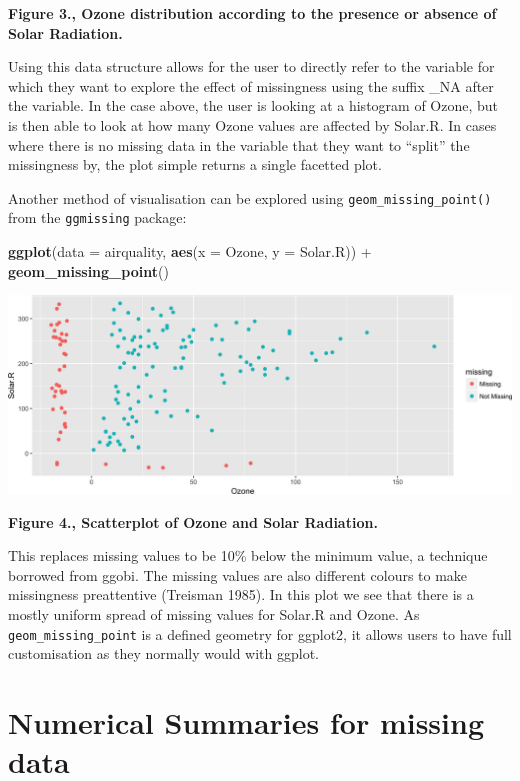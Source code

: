 \documentclass[]{article}
\newenvironment{Shaded}{\begin{snugshade}}{\end{snugshade}}
\newcommand{\KeywordTok}[1]{\textcolor[rgb]{0.13,0.29,0.53}{\textbf{{#1}}}}
\newcommand{\DataTypeTok}[1]{\textcolor[rgb]{0.13,0.29,0.53}{{#1}}}
\newcommand{\StringTok}[1]{\textcolor[rgb]{0.31,0.60,0.02}{{#1}}}
\newcommand{\NormalTok}[1]{{#1}}
\begin{document}
\textbf{Figure 3., Ozone distribution according to the presence or
absence of Solar Radiation.}

Using this data structure allows for the user to directly refer to the
variable for which they want to explore the effect of missingness using
the suffix \_NA after the variable. In the case above, the user is
looking at a histogram of Ozone, but is then able to look at how many
Ozone values are affected by Solar.R. In cases where there is no missing
data in the variable that they want to ``split'' the missingness by, the
plot simple returns a single facetted plot.

Another method of visualisation can be explored using
\texttt{geom\_missing\_point()} from the \texttt{ggmissing} package:

\begin{Shaded}
\begin{Highlighting}[]
\KeywordTok{ggplot}\NormalTok{(}\DataTypeTok{data =} \NormalTok{airquality,}
       \KeywordTok{aes}\NormalTok{(}\DataTypeTok{x =} \NormalTok{Ozone,}
           \DataTypeTok{y =} \NormalTok{Solar.R)) +}\StringTok{ }
\StringTok{  }\KeywordTok{geom_missing_point}\NormalTok{()}
\end{Highlighting}
\end{Shaded}

\includegraphics{jsm2017_njtierney_files/figure-latex/ggeom_missing-1.png}

\textbf{Figure 4., Scatterplot of Ozone and Solar Radiation.}

This replaces missing values to be 10\% below the minimum value, a
technique borrowed from ggobi. The missing values are also different
colours to make missingness preattentive (Treisman 1985). In this plot
we see that there is a mostly uniform spread of missing values for
Solar.R and Ozone. As \texttt{geom\_missing\_point} is a defined
geometry for ggplot2, it allows users to have full customisation as they
normally would with ggplot.

\section{Numerical Summaries for missing
data}\label{numerical-summaries-for-missing-data}
\end{document}
